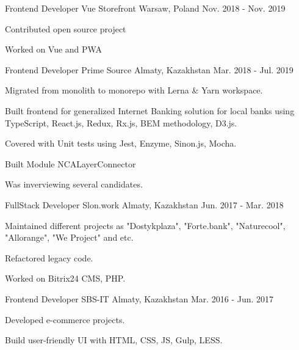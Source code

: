 \begin{cventries}
  \cventry
    {Frontend Developer} %
    {Vue Storefront} %
    {Warsaw, Poland} %
    {Nov. 2018 - Nov. 2019} %
    {
      \begin{cvitems} %
        \item {Contributed open source project}
        \item {Worked on Vue and PWA}
      \end{cvitems}
    }

  \cventry
    {Frontend Developer} %
    {Prime Source} %
    {Almaty, Kazakhstan} %
    {Mar. 2018 - Jul. 2019} %
    {
      \begin{cvitems} %
        \item {Migrated from monolith to monorepo with Lerna & Yarn workspace.}
        \item {Built frontend for generalized Internet Banking solution for local banks using TypeScript, React.js, Redux, Rx.js, BEM methodology, D3.js.}
        \item {Covered with Unit tests using Jest, Enzyme, Sinon.js, Mocha.}
        \item {Built Module NCALayerConnector}
        \item {Was inverviewing several candidates.}
      \end{cvitems}
    }

  \cventry
    {FullStack Developer} %
    {Slon.work} %
    {Almaty, Kazakhstan} %
    {Jun. 2017 - Mar. 2018} %
    {
      \begin{cvitems} %
        \item {Maintained different projects as "Dostykplaza", "Forte.bank", "Naturecool", "Allorange", "We Project" and etc.}
        \item {Refactored legacy code.}
        \item {Worked on Bitrix24 CMS, PHP.}
      \end{cvitems}
    }

  \cventry
    {Frontend Developer} %
    {SBS-IT} %
    {Almaty, Kazakhstan} %
    {Mar. 2016 - Jun. 2017} %
    {
      \begin{cvitems} %
        \item {Developed e-commerce projects.}
        \item {Build user-friendly UI with HTML, CSS, JS, Gulp, LESS.}
      \end{cvitems}
    }


\end{cventries}
